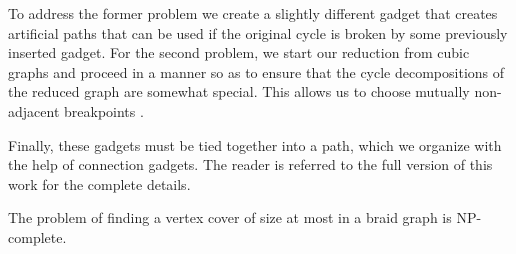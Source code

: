 \documentclass[svgnames]{llncs}
\newcommand{\NPC}{\textrm{\textup{NP-complete}}\xspace}
\begin{document}
{To address the former problem we create a slightly different gadget that creates artificial paths that can be used if the original cycle is broken by some previously inserted gadget. 
For the second problem, we start our reduction from cubic graphs and proceed in a manner so as to ensure that the cycle decompositions of the reduced graph are somewhat special. This allows us to choose mutually non-adjacent breakpoints .

Finally, these gadgets must be tied together into a path, which we organize with the help of connection gadgets. The reader is referred to the full version of this work for the complete details. 

\begin{theorem}
The problem of finding a vertex cover of size at most  in a braid graph is \NPC{}.
\end{theorem}


}
\end{document}
